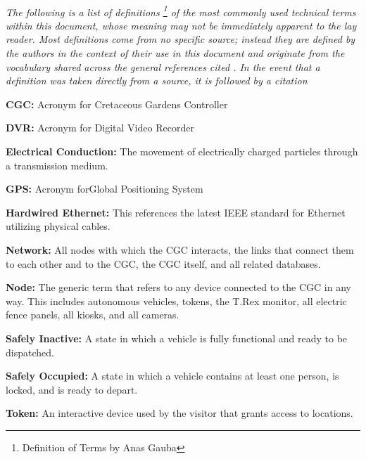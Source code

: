 \documentclass[12pt]{article}
\begin{document}
	\paragraph{} \textit{The following is a list of definitions \footnote{Definition of Terms by Anas Gauba} of the most commonly 
	used technical terms within this document, whose meaning may not be immediately 
	apparent to the lay reader. Most definitions come from no specific source; instead 
	they are defined by the authors in the context of their use in this document and 
	originate from the vocabulary shared across the general references cited \nocite{*}. In 
	the event that a definition was taken directly from a source, it is followed by a 
	citation}
	
	\begin{list}{}{}
	\item \textbf{CGC:} Acronym for Cretaceous Gardens Controller 
	\item \textbf{DVR:} Acronym for Digital Video Recorder
	\item \textbf{Electrical Conduction:} The movement of electrically charged particles through a transmission medium.
	\item \textbf{GPS:} Acronym forGlobal Positioning System 
	\item \textbf{Hardwired Ethernet:} This references the latest IEEE standard for Ethernet utilizing physical cables.
	\item \textbf{Network:} All nodes with which the CGC interacts, the links that connect them to each other and to the
	CGC, the CGC itself, and all related databases.
	\item \textbf{Node:} The generic term that refers to any device connected to the CGC in any way. This includes 
	autonomous vehicles, tokens, the T.Rex monitor, all electric fence panels, all kiosks, and all cameras.
	\item \textbf{Safely Inactive:} A state in which a vehicle is fully functional and ready to be dispatched.
	\item \textbf{Safely Occupied:} A state in which a vehicle contains at least one person, is locked, and is ready to depart.
	\item \textbf{Token:} An interactive device used by the visitor that grants access to locations.
	\end{list}
	
\pagebreak
\end{document}

